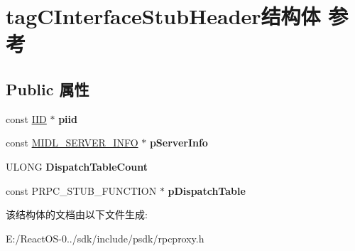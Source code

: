 \hypertarget{structtag_c_interface_stub_header}{}\section{tag\+C\+Interface\+Stub\+Header结构体 参考}
\label{structtag_c_interface_stub_header}
\subsection*{Public 属性}
\begin{DoxyCompactItemize}
\item 
\mbox{\label{structtag_c_interface_stub_header_add04e432b294da278249545262342f81}} 
const \hyperlink{struct___i_i_d}{I\+ID} $\ast$ {\bfseries piid}
\item 
\mbox{\label{structtag_c_interface_stub_header_a54f9d6bee6d602b599fa157854c68ed6}} 
const \hyperlink{struct___m_i_d_l___s_e_r_v_e_r___i_n_f_o__}{M\+I\+D\+L\+\_\+\+S\+E\+R\+V\+E\+R\+\_\+\+I\+N\+FO} $\ast$ {\bfseries p\+Server\+Info}
\item 
\mbox{\label{structtag_c_interface_stub_header_a549baf173448bbc15124d629c801f37e}} 
U\+L\+O\+NG {\bfseries Dispatch\+Table\+Count}
\item 
\mbox{\label{structtag_c_interface_stub_header_a48054f3419f675f8af2ac337146c6fc7}} 
const P\+R\+P\+C\+\_\+\+S\+T\+U\+B\+\_\+\+F\+U\+N\+C\+T\+I\+ON $\ast$ {\bfseries p\+Dispatch\+Table}
\end{DoxyCompactItemize}


该结构体的文档由以下文件生成\+:\begin{DoxyCompactItemize}
\item 
E\+:/\+React\+O\+S-\/0../sdk/include/psdk/rpcproxy.\+h\end{DoxyCompactItemize}
